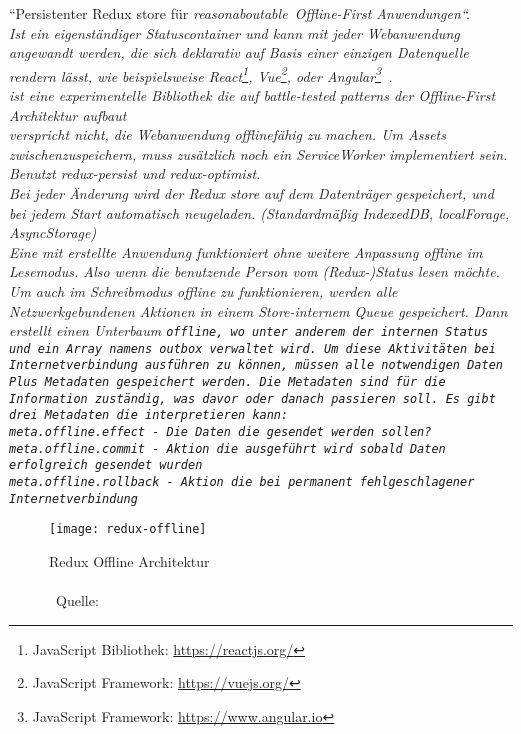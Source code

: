 ``Persistenter Redux store für \it{reasonaboutable}\texttrademark ~Offline-First Anwendungen``. \\
Ist ein eigenständiger Statuscontainer und kann mit jeder Webanwendung angewandt werden, die sich \it{deklarativ auf Basis einer einzigen Datenquelle rendern lässt}, wie beispielsweise React\footnote{JavaScript Bibliothek: \url{https://reactjs.org/}}, Vue\footnote{JavaScript Framework: \url{https://vuejs.org/}}, oder Angular\footnote{JavaScript Framework: \url{https://www.angular.io}}~\cite{redux-offline-compabilaty}.\\
ist eine experimentelle Bibliothek die auf \it{battle-tested} patterns der Offline-First Architektur aufbaut\\
 verspricht nicht, die Webanwendung offlinefähig zu machen. Um \gls{Assets} zwischenzuspeichern, muss zusätzlich noch ein ServiceWorker implementiert sein.\\
Benutzt redux-persist und redux-optimist.\\
Bei jeder Änderung wird der Redux store auf dem Datenträger gespeichert, und bei jedem Start automatisch neugeladen. (Standardmäßig IndexedDB, localForage, AsyncStorage)\\
Eine mit  erstellte Anwendung funktioniert ohne weitere Anpassung offline im Lesemodus. Also wenn die benutzende Person vom (Redux-)Status lesen möchte.
Um auch im Schreibmodus offline zu funktionieren, werden alle Netzwerkgebundenen Aktionen in einem Store-internem \gls{Queue} gespeichert. Dann erstellt  einen Unterbaum \tt{offline}, wo unter anderem der internen Status und ein Array namens \tt{outbox} verwaltet wird. Um diese Aktivitäten bei Internetverbindung ausführen zu können, müssen alle notwendigen Daten Plus Metadaten gespeichert werden. Die Metadaten sind für die Information zuständig, was davor oder danach passieren soll. Es gibt drei Metadaten die  interpretieren kann:\\
\tt{meta.offline.effect} - Die Daten die gesendet werden sollen?\\
\tt{meta.offline.commit} - Aktion die ausgeführt wird sobald Daten erfolgreich gesendet wurden\\
\tt{meta.offline.rollback} - Aktion die bei permanent fehlgeschlagener Internetverbindung
~\cite{redux-offline-gh}
\begin{figure}[H]
  \centering
  \texttt{[image: redux-offline]}
  \grayRule
  \caption[Redux Offline]{Redux Offline Architektur\\\\~Quelle:~\cite{redux-offline}}
  \label{fig:redux-offline}
\end{figure}
